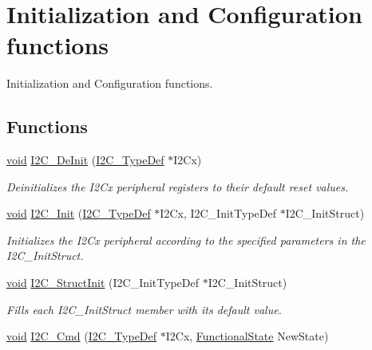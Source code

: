 \hypertarget{group___i2_c___group1}{\section{Initialization and Configuration functions}
\label{group___i2_c___group1}
}


Initialization and Configuration functions.  


\subsection*{Functions}
\begin{DoxyCompactItemize}
\item 
\hyperlink{group___n_a_m_e_ga18028b8badbf1ea7e704ccac3c488e82}{void} \hyperlink{group___i2_c___group1_ga2ee214364603059ad5d9089f749f5bfd}{I2\-C\-\_\-\-De\-Init} (\hyperlink{struct_i2_c___type_def}{I2\-C\-\_\-\-Type\-Def} $\ast$I2\-Cx)
\begin{DoxyCompactList}\small\item\em Deinitializes the I2\-Cx peripheral registers to their default reset values. \end{DoxyCompactList}\item 
\hyperlink{group___n_a_m_e_ga18028b8badbf1ea7e704ccac3c488e82}{void} \hyperlink{group___i2_c___group1_gaac29465bca70fbc91c2f922ab67bb88e}{I2\-C\-\_\-\-Init} (\hyperlink{struct_i2_c___type_def}{I2\-C\-\_\-\-Type\-Def} $\ast$I2\-Cx, I2\-C\-\_\-\-Init\-Type\-Def $\ast$I2\-C\-\_\-\-Init\-Struct)
\begin{DoxyCompactList}\small\item\em Initializes the I2\-Cx peripheral according to the specified parameters in the I2\-C\-\_\-\-Init\-Struct. \end{DoxyCompactList}\item 
\hyperlink{group___n_a_m_e_ga18028b8badbf1ea7e704ccac3c488e82}{void} \hyperlink{group___i2_c___group1_ga08582aca6d7d7910cd5cbff0d9def350}{I2\-C\-\_\-\-Struct\-Init} (I2\-C\-\_\-\-Init\-Type\-Def $\ast$I2\-C\-\_\-\-Init\-Struct)
\begin{DoxyCompactList}\small\item\em Fills each I2\-C\-\_\-\-Init\-Struct member with its default value. \end{DoxyCompactList}\item 
\hyperlink{group___n_a_m_e_ga18028b8badbf1ea7e704ccac3c488e82}{void} \hyperlink{group___i2_c___group1_ga7e1323c9133c2cb424dfb5b10b7d2f0b}{I2\-C\-\_\-\-Cmd} (\hyperlink{struct_i2_c___type_def}{I2\-C\-\_\-\-Type\-Def} $\ast$I2\-Cx, \hyperlink{group___exported__types_gac9a7e9a35d2513ec15c3b537aaa4fba1}{Functional\-State} New\-State)

\end{DoxyCompactItemize}
